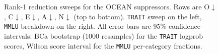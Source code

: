 \begin{figure}[htbp]
    \centering
    \caption{Rank-1 reduction sweeps for the OCEAN suppressors. Rows are O$\downarrow$, C$\downarrow$, E$\downarrow$, A$\downarrow$, N$\downarrow$ (top to bottom). \texttt{TRAIT} sweep on the left, \texttt{MMLU} breakdown on the right. All error bars are 95\% confidence intervals: BCa bootstrap (1000 resamples) for the \texttt{TRAIT} logprob scores, Wilson score interval for the \texttt{MMLU} per-category fractions.}
    \label{fig:downrank_suppressors}
\end{figure}
\FloatBarrier